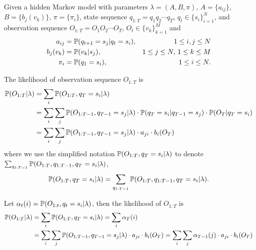 Given a hidden Markov model with parameters $\lambda = (A, B, \pi)$,
$A = \{a_{ij}\}$, $B = \{b_j(v_k)\}$, $\pi = \{\pi_i\}$, 
state sequence $q_{1:T} = q_1 q_2 \cdots q_T, \, q_t \in \{s_i\}_{i=1}^N$,
and observation sequence $O_{1:T} = O_1 O_2 \cdots O_T, \, O_t \in \{v_k\}_{k=1}^M$ and
\begin{align*}
a_{ij} &= \mathbb{P}(q_{t+1} = s_j |q_{t} = s_i), & 1 \le i,j \le N \\
b_j(v_k) &= \mathbb{P}(v_k |s_j),                   & 1 \le j \le N, \, 1 \le k \le M   \\
\pi_i  &= \mathbb{P}(q_1 = s_i),                  & 1 \le i \le N.
\end{align*}

The likelihood of observation sequence $O_{1:T}$ is
\begin{align*}
\mathbb{P}(O_{1:T} |\lambda) &= \sum_{i} \mathbb{P}(O_{1:T}, q_T = s_i |\lambda) \\
&= \sum_{i} \sum_{j} \mathbb{P}(O_{1:T-1}, q_{T-1} = s_j |\lambda) \cdot \mathbb{P}(q_T = s_i |q_{T-1} = s_j) \cdot \mathbb{P}(O_T |q_T = s_i) \\
&= \sum_{i} \sum_{j} \mathbb{P}(O_{1:T-1}, q_{T-1} = s_j |\lambda) \cdot a_{ji} \cdot b_i(O_T)
\end{align*}
where we use the simplified notation $\mathbb{P}(O_{1:T}, q_T = s_i |\lambda)$ to denote $\sum_{q_{1:T-1}} \mathbb{P}(O_{1:T}, q_{1:T-1}, q_T = s_i |\lambda)$,
\ie 
\begin{equation*}
\mathbb{P}(O_{1:T}, q_T = s_i |\lambda) = \sum_{q_{1:T-1}} \mathbb{P}(O_{1:T}, q_{1:T-1}, q_T = s_i |\lambda).
\end{equation*}

Let $\alpha_t(i) = \mathbb{P}(O_{1:t}, q_t = s_i |\lambda)$, then the likelihood of $O_{1:T}$ is
\begin{align*}
\mathbb{P}(O_{1:T} |\lambda) &= \sum_{i} \mathbb{P}(O_{1:T}, q_T = s_i |\lambda) = \sum_{i} \alpha_T(i) \\
&= \sum_{i} \sum_{j} \mathbb{P}(O_{1:T-1}, q_{T-1} = s_j |\lambda) \cdot a_{ji} \cdot b_i(O_T) = \sum_{i} \sum_{j} \alpha_{T-1}(j) \cdot a_{ji} \cdot b_i(O_T)
\end{align*}
